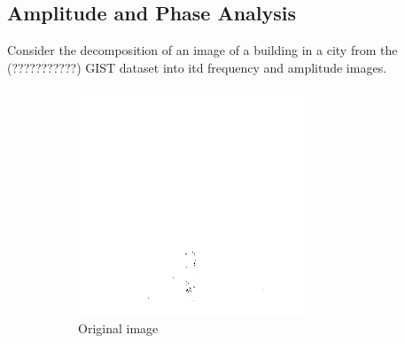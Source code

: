 \documentclass{report}
\begin{document}
\subsection{Amplitude and Phase Analysis}
Consider the decomposition of an image of a building in a city from the (???????????) GIST dataset into itd frequency and amplitude images.
\begin{figure}[H]
        \centering
        \begin{subfigure}[b]{0.2\textwidth}
                \includegraphics[width=\textwidth]{graphics/original.png}
                \caption{Original image}
                \label{fig:gull}
        \end{subfigure}%
        ~
        \begin{subfigure}[b]{0.2\textwidth}

\end{subfigure}
\end{figure}
\end{document}
